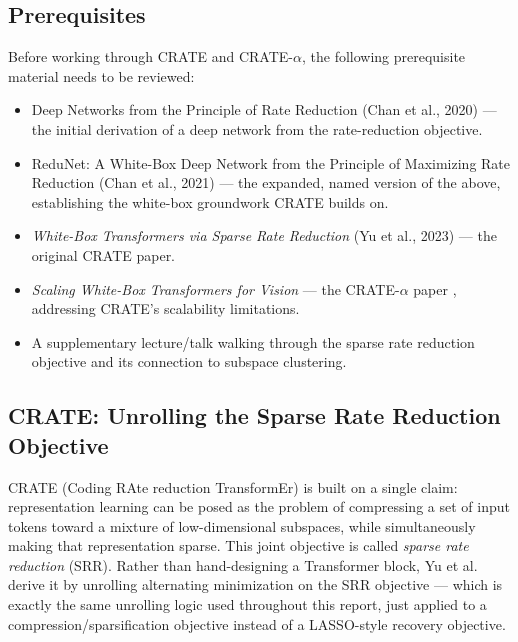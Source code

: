 \documentclass[conference]{IEEEtran}
\begin{document}
\subsection{Prerequisites}
Before working through CRATE and CRATE-$\alpha$, the following prerequisite material needs to be reviewed:
\begin{itemize}
    \item[$\bullet$] Deep Networks from the Principle of Rate Reduction (Chan et al., 2020) \cite{chan2020deep} — the initial derivation of a deep network from the rate-reduction objective.
    \item[$\bullet$] ReduNet: A White-Box Deep Network from the Principle of Maximizing Rate Reduction (Chan et al., 2021) \cite{chan2021redunet} — the expanded, named version of the above, establishing the white-box groundwork CRATE builds on.
    \item[$\bullet$] \textit{White-Box Transformers via Sparse Rate Reduction} (Yu et al., 2023) \cite{yu2023whitebox} — the original CRATE paper.
    \item[$\bullet$] \textit{Scaling White-Box Transformers for Vision} — the CRATE-$\alpha$ paper \cite{yu2024scaling}, addressing CRATE's scalability limitations.
    \item[$\bullet$] A supplementary lecture/talk walking through the sparse rate reduction objective and its connection to subspace clustering.
\end{itemize}

\subsection{CRATE: Unrolling the Sparse Rate Reduction Objective}
CRATE (Coding RAte reduction TransformEr) is built on a single claim: representation learning can be posed as the problem of compressing a set of input tokens toward a mixture of low-dimensional subspaces, while simultaneously making that representation sparse. This joint objective is called \textit{sparse rate reduction} (SRR). Rather than hand-designing a Transformer block, Yu et al. \cite{yu2023whitebox} derive it by unrolling alternating minimization on the SRR objective — which is exactly the same unrolling logic used throughout this report, just applied to a compression/sparsification objective instead of a LASSO-style recovery objective. 
\end{document}
